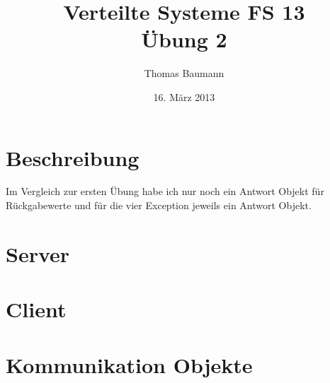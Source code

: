 \documentclass[10pt]{article}
\title{
	\vspace{5cm}
	Verteilte Systeme FS 13\\
	Übung 2
}
\author{Thomas Baumann}
\date{16. März 2013}
\let\stdsection\section{}
\renewcommand{\section}{\newpage\stdsection}
\begin{document}
\maketitle
\thispagestyle{fancy}

\newpage

\tableofcontents	  	


\newpage
\setcounter{page}{1}

\section{Beschreibung}
Im Vergleich zur ersten Übung habe ich nur noch ein Antwort Objekt für Rückgabewerte und für die vier Exception jeweils ein Antwort Objekt.

\section{Server}




\section{Client}



\section{Kommunikation Objekte}
\end{document}
